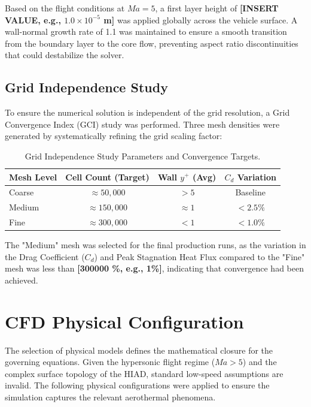 Based on the flight conditions at $Ma = 5$, a first layer height of \textbf{[INSERT VALUE, e.g., $1.0 \times 10^{-5}$ m]} was applied globally across the vehicle surface. A wall-normal growth rate of 1.1 was maintained to ensure a smooth transition from the boundary layer to the core flow, preventing aspect ratio discontinuities that could destabilize the solver.

\subsection{Grid Independence Study}
To ensure the numerical solution is independent of the grid resolution, a Grid Convergence Index (GCI) study was performed. Three mesh densities were generated by systematically refining the grid scaling factor:

\begin{table}[H]
    \centering
    \caption{Grid Independence Study Parameters and Convergence Targets.}
    \label{tab:mesh_independence}
    \begin{tabular}{|l|c|c|c|}
        \hline
        \textbf{Mesh Level} & \textbf{Cell Count (Target)} & \textbf{Wall $y^+$ (Avg)} & \textbf{$C_d$ Variation} \\ \hline
        Coarse & $\approx 50,000$ & $> 5$ & Baseline \\ \hline
        Medium & $\approx 150,000$ & $\approx 1$ & $< 2.5\%$ \\ \hline
        Fine   & $\approx 300,000$ & $< 1$ & $< 1.0\%$ \\ \hline
    \end{tabular}
\end{table}
The "Medium" mesh was selected for the final production runs, as the variation in the Drag Coefficient ($C_d$) and Peak Stagnation Heat Flux compared to the "Fine" mesh was less than \textbf{[300000 \%, e.g., 1\%]}, indicating that convergence had been achieved.

\section{CFD Physical Configuration}
The selection of physical models defines the mathematical closure for the governing equations. Given the hypersonic flight regime ($Ma > 5$) and the complex surface topology of the HIAD, standard low-speed assumptions are invalid. The following physical configurations were applied to ensure the simulation captures the relevant aerothermal phenomena.

